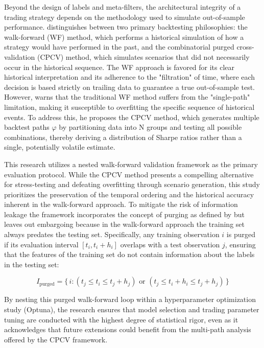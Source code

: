 \documentclass[12pt, a4paper]{article}
\begin{document}
Beyond the design of labels and meta-filters, the architectural integrity of a trading strategy depends on the methodology used to simulate out-of-sample performance. 
\textcite{lopez_de_prado_advances_2018} distinguishes between two primary backtesting philosophies: 
the walk-forward (WF) method, which performs a historical simulation of how a strategy would have performed in the past, 
and the combinatorial purged cross-validation (CPCV) method, which simulates scenarios that did not necessarily occur in the historical sequence. 
The WF approach is favored for its clear historical interpretation and its adherence to the "filtration" of time, 
where each decision is based strictly on trailing data to guarantee a true out-of-sample test. 
However, \textcite{lopez_de_prado_advances_2018} warns that the traditional WF method suffers from the "single-path" limitation, 
making it susceptible to overfitting the specific sequence of historical events. 
To address this, he proposes the CPCV method, which generates multiple backtest paths \( \varphi \) by partitioning data into N groups and testing all possible combinations, 
thereby deriving a distribution of Sharpe ratios rather than a single, potentially volatile estimate.

\medskip

This research utilizes a nested walk-forward validation framework as the primary evaluation protocol. 
While the CPCV method presents a compelling alternative for stress-testing and defeating overfitting through scenario generation,
this study prioritizes the preservation of the temporal ordering and the historical accuracy inherent in the walk-forward approach. 
To mitigate the risk of information leakage the framework incorporates the concept of purging as defined by \textcite{lopez_de_prado_advances_2018} 
but leaves out embargoing because in the walk-forward approach the training set always predates the testing set. 
Specifically, any training observation \( i \) is purged if its evaluation interval \( \left[ t_i, t_i + h_i \right] \) 
overlaps with a test observation \( j \), ensuring that the features of the training set do not contain information about the labels in the testing set:

\begin{equation}
I_{\text{purged}} = \{\, i : (t_j \leq t_i \leq t_j + h_j) \text{ or } (t_j \leq t_i + h_i \leq t_j + h_j) \,\}
\label{eq:purging}
\end{equation}

By nesting this purged walk-forward loop within a hyperparameter optimization study (Optuna), 
the research ensures that model selection and trading parameter tuning are conducted with the highest degree of statistical rigor, 
even as it acknowledges that future extensions could benefit from the multi-path analysis offered by the CPCV framework.
\end{document}
